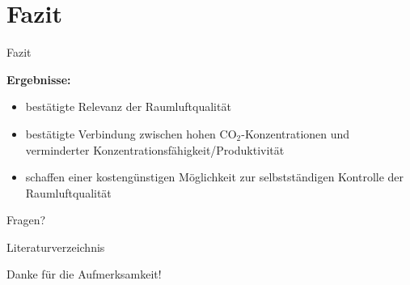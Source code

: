 \documentclass[10pt,ngerman]{beamer}
\begin{document}
\section{Fazit}
\begin{frame}[fragile]{Fazit}
  \begin{minipage}[t]{0.80\textwidth}
    \textbf{Ergebnisse:}\newline
    \begin{itemize}
      \item bestätigte Relevanz der Raumluftqualität
      \item bestätigte Verbindung zwischen hohen CO$_2$-Konzentrationen und verminderter Konzentrationsfähigkeit/Produktivität
      \item schaffen einer kostengünstigen Möglichkeit zur selbstständigen Kontrolle der Raumluftqualität
    \end{itemize}
  \end{minipage}
\end{frame}

\begin{frame}[standout]
  Fragen?
\end{frame}

\appendix

\begin{frame}[allowframebreaks]{Literaturverzeichnis}

  \printbibliography[title={Quellenverzeichnis}]

\end{frame}

\begin{frame}[standout]
  Danke für die Aufmerksamkeit!
\end{frame}
\end{document}
